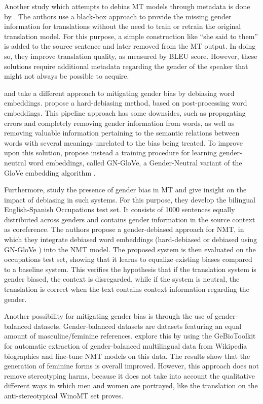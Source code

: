 Another study which attempts to debias MT models through metadata is done by \citet{Moryossef_2019}. The authors use a black-box approach to provide the missing gender information for translations without the need to train or retrain the original translation model. For this purpose, a simple construction like “she said to them” is added to the source sentence and later removed from the MT output. In doing so, they improve translation quality, as measured by BLEU score. However, these solutions require additional metadata regarding the gender of the speaker that might not always be possible to acquire.

\citet{bolukbasi2016man} and \citet{Zhao_2018_GN-GloVe} take a different approach to mitigating gender bias by debiasing word embeddings. \citet{bolukbasi2016man} propose a hard-debiasing method, based on post-processing word embeddings. This pipeline approach has some downsides, such as propagating errors and completely removing gender information from words, as well as removing valuable information pertaining to the semantic relations between words with several meanings unrelated to the bias being treated.
To improve upon this solution, \citet{Zhao_2018_GN-GloVe} propose instead a training procedure for learning gender-neutral word embeddings, called GN-GloVe, a Gender-Neutral variant of the GloVe embedding algorithm \parencite{Glove}.

Furthermore, \citet{Escud_Font_2019} study the presence of gender bias in MT and give insight on
the impact of debiasing in such systems. For this purpose, they develop the bilingual English-Spanish Occupations test set. It consists of 1000 sentences equally distributed across genders and contains gender information in the source context as coreference. The authors propose a gender-debiased approach for NMT, in which they integrate debiased word embeddings (hard-debiased \parencite{bolukbasi2016man} or debiased using GN-GloVe \parencite{Zhao_2018_GN-GloVe}) into the NMT model. The proposed system is then evaluated on the occupations test set, showing that it learns to equalize existing biases compared to a baseline system. This verifies the hypothesis that if the translation system is gender biased, the context is disregarded, while if the system is neutral, the translation is correct when the text contains context information regarding the gender.

Another possibility for mitigating gender bias is through the use of gender-balanced datasets. Gender-balanced datasets are datasets featuring an equal amount of masculine/feminine references. \citet{costa2020fine} explore this by using the GeBioToolkit \parencite{costa2019gebiotoolkit} for automatic extraction of gender-balanced multilingual data from Wikipedia biographies and fine-tune NMT models on this data. The results show that the generation of feminine forms is overall improved. However, this approach does not remove stereotyping harms, because it does not take into account the qualitative different ways in which men and women are portrayed, like the translation on the anti-stereotypical WinoMT set proves.

